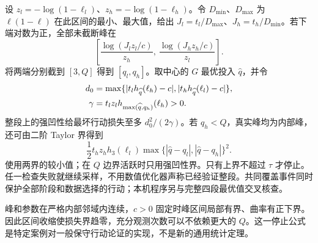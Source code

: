 设 $z_l=-\log(1-\ell_l)$、$z_h=-\log(1-\ell_h)$。令 $D_{\min}$、$D_{\max}$ 为 $\ell(1-\ell)$ 在此区间的最小、最大值，给出 $J_l=t_l/D_{\max}$、$J_h=t_h/D_{\min}$。若下端对数为正，全部未截断峰在
\[
 \left[\frac{\log(J_lz_l/c)}{z_h},\
       \frac{\log(J_hz_h/c)}{z_l}\right].
\]
将两端分别截到 $[3,Q]$ 得到 $[q_l,q_h]$。取中心的 $G$ 最优投入 $\widehat q$，并令
\begin{align}
 d_0&=\max\{|t_lh_{\widehat q}(\ell_h)-c|,
                    |t_hh_{\widehat q}(\ell_l)-c|\},\notag\\
 \gamma&=t_lz_lh_{\max(\widehat q,q_h)}(\ell_h)>0.
\end{align}
整段上的强凹性给最坏行动损失至多 $d_0^2/(2\gamma)$。若 $q_h<Q$，真实峰均为内部峰，还可由二阶 Taylor 界得到
\[
 \frac12 t_hz_hh_3(\ell_l)
 \max\{|\widehat q-q_l|,|\widehat q-q_h|\}^2.
\]
使用两界的较小值；在 $Q$ 边界活跃时只用强凹性界。只有上界不超过 $\tau$ 才停止。任一检查失败就继续采样，不用数值优化器声称已经验证整段。共同覆盖事件同时保护全部阶段和数据选择的行动；本机程序另与完整四段最优值交叉核查。

峰和参数在严格内部邻域内连续，$c>0$ 固定时峰区间局部有界、曲率有正下界。因此区间收缩使损失界趋零，充分观测次数可以不依赖更大的 $Q$。这一停止公式是特定案例对一般保守行动论证的实现，不是新的通用统计定理。
